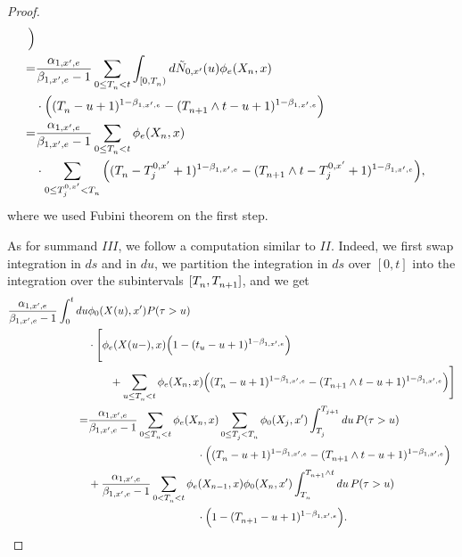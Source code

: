 \documentclass[10pt, article,table]{article}
\begin{document}
\begin{proof}
\begin{equation*}
\begin{split}
 \Big)
 \\
 =&
 \frac{\impCoef_{1,\xone,e}}{\decCoef_{1,\xone,e} - 1}
 \sum_{0\leq \arrivalTimes[]_n < t}
 \int_{[0,\arrivalTimes[]_n)} d\hybridHawkes_{0,\xone}(u)
 \transProb_{e}(\stateVariable_n, x) 
 \\
 &
 \cdot 
 \Big(
 (\arrivalTimes[]_n - u +1)^{1-\decCoef_{1,\xone,e}}
  - (\arrivalTimes[]_{n+1}\wedge t - u +1)^{1-\decCoef_{1,\xone,e}}  
 \Big)
 \\
 =&
 \frac{\impCoef_{1,\xone,e}}{\decCoef_{1,\xone,e} - 1}
 \sum_{0\leq \arrivalTimes[]_n < t}
 \transProb_{e}(\stateVariable_n, x)
 \\
 &
 \cdot
 \sum_{0\leq \arrivalTimes[0,\xone]_j < \arrivalTimes[]_n}  
 \Big(
 (\arrivalTimes[]_n - \arrivalTimes[0,\xone]_j +1)^{1-\decCoef_{1,\xone,e}}
  - (\arrivalTimes[]_{n+1}\wedge t - \arrivalTimes[0,\xone]_j +1)^{1-\decCoef_{1,\xone,e}}  
 \Big),
 \end{split}
\end{equation*}
where we used Fubini theorem on the first step. 

As for summand $III$, we follow a computation similar to $II$. Indeed, we first swap integration in $ds$ and in $du$, we partition the integration in $ds$ over $[0,t]$ into the integration over the subintervals $[\arrivalTimes[]_n , \arrivalTimes[]_{n+1}]$, and we get 
\begin{equation*}
 \begin{split}
   \frac{\impCoef_{1,\xone,e}}{\decCoef_{1,\xone,e} - 1}
   \intzerot du & \transProb_{0}(\stateVariable(u),\xone) \Prob(\terminationTime > u)
   \\
   & \cdot
   \Bigg[
   \transProb_{e}(\stateVariable(u-),x) \Big( 1- (t_u - u +1)^{1-\decCoef_{1,\xone,e}}\Big)
   \\
   & \qquad 
   + \sum_{u\leq \arrivalTimes[]_n < t} \transProb_{e}(\stateVariable_n,x)\Big( (\arrivalTimes[]_n - u +1)^{1-\decCoef_{1,\xone,e}} - (\arrivalTimes[]_{n+1}\wedge t - u +1)^{1-\decCoef_{1,\xone,e}}\Big)
   \Bigg]
   \\
   =&
   \frac{\impCoef_{1,\xone,e}}{\decCoef_{1,\xone,e} - 1}
   \sum_{0\leq \arrivalTimes[]_n < t} \transProb_{e}(\stateVariable_n, x) \sum_{0\leq \arrivalTimes[]_j < \arrivalTimes[]_n} \transProb_{0}(\stateVariable_j, \xone) \int_{\arrivalTimes[]_{j}}^{\arrivalTimes[]_{j+1}}du \, \Prob(\terminationTime>u)
   \\
   & \qquad \qquad \qquad \qquad \qquad \cdot 
   \Big( (\arrivalTimes[]_n - u +1)^{1-\decCoef_{1,\xone,e}} - (\arrivalTimes[]_{n+1}\wedge t - u +1)^{1-\decCoef_{1,\xone,e}}\Big)
   \\
   & + 
   \frac{\impCoef_{1,\xone,e}}{\decCoef_{1,\xone,e} - 1}
   \sum_{0<  \arrivalTimes[]_n < t} \transProb_{e}(\stateVariable_{n-1}, x)  \transProb_{0}(\stateVariable_n, \xone)\int_{\arrivalTimes[]_n}^{\arrivalTimes[]_{n+1}\wedge t} du \, \Prob(\terminationTime>u)
   \\
   & \qquad \qquad \qquad \qquad \qquad \cdot 
   \Big( 1- (\arrivalTimes[]_{n+1} - u +1)^{1-\decCoef_{1,\xone,e}}\Big).
 \end{split}
\end{equation*}
\end{proof}
\end{document}
